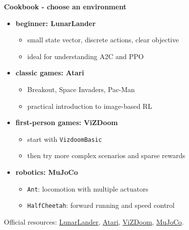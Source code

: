 \documentclass[xcolor=dvipsnames]{beamer}
\begin{document}
\begin{frame}{\bf Cookbook - choose an environment}

  \begin{itemize}
    \item \textbf{beginner: LunarLander}
      \begin{itemize}
        \item small state vector, discrete actions, clear objective
        \item ideal for understanding A2C and PPO
      \end{itemize}

    \item \textbf{classic games: Atari}
      \begin{itemize}
        \item Breakout, Space Invaders, Pac-Man
        \item practical introduction to image-based RL
      \end{itemize}

    \item \textbf{first-person games: ViZDoom}
      \begin{itemize}
        \item start with \texttt{VizdoomBasic}
        \item then try more complex scenarios and sparse rewards
      \end{itemize}

    \item \textbf{robotics: MuJoCo}
      \begin{itemize}
        \item \texttt{Ant}: locomotion with multiple actuators
        \item \texttt{HalfCheetah}: forward running and speed control
      \end{itemize}
  \end{itemize}

  \vspace{0.1cm}
  \footnotesize
  Official resources:
  \href{https://gymnasium.farama.org/environments/box2d/lunar_lander/}
       {LunarLander},
  \href{https://ale.farama.org/}
       {Atari},
  \href{https://vizdoom.farama.org/}
       {ViZDoom},
  \href{https://gymnasium.farama.org/environments/mujoco/}
       {MuJoCo}.

\end{frame}
\end{document}
